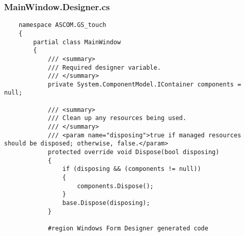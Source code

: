 \subsubsection{MainWindow.Designer.cs}
\begin{lstlisting}
	namespace ASCOM.GS_touch
	{
		partial class MainWindow
		{
			/// <summary>
			/// Required designer variable.
			/// </summary>
			private System.ComponentModel.IContainer components = null;
			
			/// <summary>
			/// Clean up any resources being used.
			/// </summary>
			/// <param name="disposing">true if managed resources should be disposed; otherwise, false.</param>
			protected override void Dispose(bool disposing)
			{
				if (disposing && (components != null))
				{
					components.Dispose();
				}
				base.Dispose(disposing);
			}
			
			#region Windows Form Designer generated code
			

\end{lstlisting}
